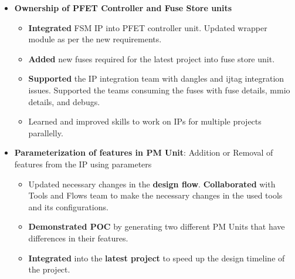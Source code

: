 \documentclass[a4paper,11pt]{article}
\newcommand{\isep}{-2 pt}
\begin{document}
\begin{itemize}
\begin{itemize}
			\item \textbf{Ownership of PFET Controller and Fuse Store units}
				\begin{itemize} \itemsep \isep
					\item \textbf{Integrated} FSM IP into PFET controller unit. Updated wrapper module as per the new requirements.
					\item \textbf{Added} new fuses required for the latest project into fuse store unit.
					\item \textbf{Supported} the IP integration team with dangles and ijtag integration issues. Supported the teams consuming the fuses with fuse details, mmio details, and debugs. %
					\item Learned and improved skills to work on IPs for multiple projects parallelly.%
				\end{itemize}
			\item \textbf{Parameterization of features in PM Unit}: Addition or Removal of features from the IP using parameters
			\begin{itemize} \itemsep \isep
				\item Updated necessary changes in the \textbf{design flow}. \textbf{Collaborated} with Tools and Flows team to make the necessary changes in the used tools and its configurations.
				\item \textbf{Demonstrated POC} by generating two different PM Units that have differences in their features.
				\item \textbf{Integrated} into the \textbf{latest project} to speed up the design timeline of the project.
			\end{itemize}
		\end{itemize}


\end{itemize}
\end{document}
